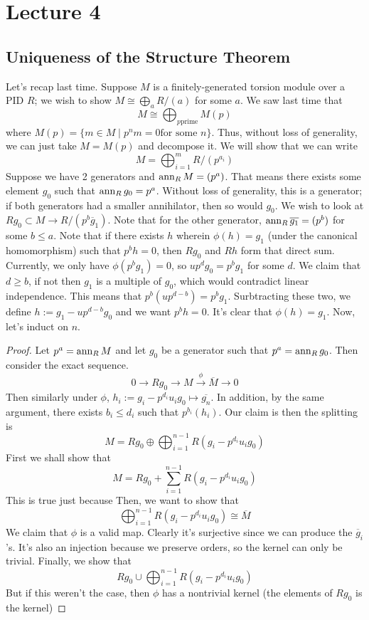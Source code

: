 \section{Lecture 4}
\subsection{Uniqueness of the Structure Theorem}
Let's recap last time. Suppose $M$ is a finitely-generated torsion module over a PID $R$; we wish to show
$M \cong \bigoplus_a R/(a)$ for some $a$.
We saw last time that
\[ M \cong \bigoplus_{p \text{prime}} M(p) \]
where $M(p) = \{ m \in M \mid p^n m = 0 \text{for some } n \}$. Thus, without loss of generality, we can just take
$M = M(p)$ and decompose it. We will show that we can write
\[ M = \bigoplus_{i = 1}^m R/(p^{a_i}) \]
Suppose we have 2 generators and $\operatorname{ann}_R M = (p^a)$. That means there exists some element
$g_0$ such that $\operatorname{ann}_R g_0 = p^a$. Without loss of generality,
this is a generator; if both generators had a smaller annihilator, then so would $g_0$.
We wish to look at $Rg_0 \subset M \to R/(p^b \overline{g}_1)$. Note that
for the other generator, $\operatorname{ann}_R \overline{g_1} = (p^b)$ for some $b \le a$.
Note that if there exists $h$ wherein $\phi(h) = g_1$ (under the canonical homomorphism)
such that $p^b h = 0$, then $Rg_0$ and $Rh$ form that direct sum. Currently, we only have $\phi(p^b g_1) = 0$,
so $u p^d g_0 = p^b g_1$ for some $d$. We claim that $d \ge b$, if not then
$g_1$ is a multiple of $g_0$, which would contradict linear independence. This means that $p^b (u p^{d - b}) = p^b g_1$. Surbtracting these two, we define
$h :=  g_1 - u p^{d - b} g_0$ and we want $p^b h = 0$. It's clear that $\phi(h) = g_1$. Now, let's induct on $n$.
\begin{proof}
    Let $p^a = \operatorname{ann}_R M$ and let $g_0$ be a generator such that $p^a = \operatorname{ann}_R g_0$. Then
    consider the exact sequence.
    \[ 0 \to Rg_0 \to M \xrightarrow{\phi} \overline{M} \to 0 \]
    Then similarly under $\phi$, $h_i := g_i - p^{d_i} u_i g_0 \mapsto \overline{g_n}$. In addition, by the same argument,
    there exists $b_i \le d_i$ such that $p^{b_i}(h_i)$. Our claim is then the splitting is
    \[ M = Rg_0 \oplus \bigoplus_{i = 1}^{n - 1} R(g_i - p^{d_i} u_i g_0) \] 
    First we shall show that
    \[ M = Rg_0 + \sum_{i = 1}^{n - 1} R(g_i - p^{d_i} u_i g_0)\]
    This is true just because 
    Then, we want to show that
    \[ \bigoplus_{i = 1}^{n - 1} R(g_i - p^{d_i} u_i g_0) \cong \overline{M} \]
    We claim that $\phi$ is a valid map. Clearly it's surjective since we can produce the $\overline{g}_i$'s.
    It's also an injection because we preserve orders, so the kernel can only be trivial.
    Finally, we show that 
    \[ Rg_0 \cup \bigoplus_{i = 1}^{n - 1} R(g_i - p^{d_i} u_i g_0) \]
    But if this weren't the case, then $\phi$ has a nontrivial kernel (the elements of $Rg_0$ is the kernel)
\end{proof}

